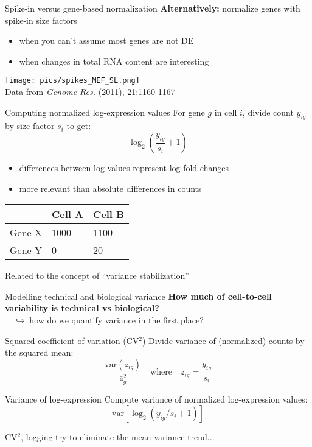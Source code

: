 \documentclass{beamer}
\begin{document}
\begin{frame}{Spike-in versus gene-based normalization}
    \vspace{0.1in}
\textbf{Alternatively:} normalize genes with spike-in size factors
\begin{itemize}
    \item when you can't assume most genes are not DE
    \item when changes in total RNA content are interesting
\end{itemize}
\begin{center}
    \texttt{[image: pics/spikes\_MEF\_SL.png]}\\
    {\tiny Data from \emph{Genome Res.} (2011), 21:1160-1167}
\end{center}
\end{frame}

\begin{frame}{Computing normalized log-expression values}
    For gene $g$ in cell $i$, divide count $y_{ig}$ by size factor $s_i$ to get:
    \[
        \log_2\left(\frac{y_{ig}}{s_{i}} + 1\right)
    \]
    
\begin{itemize}
    \item differences between log-values represent log-fold changes
    \item more relevant than absolute differences in counts
\end{itemize}
\begin{center}
\begin{tabular}{l l l}
\hline
& Cell A & Cell B \\
\hline
Gene X & 1000 & 1100 \\
Gene Y & 0 & 20 \\
\hline
\end{tabular}
\end{center}
Related to the concept of ``variance stabilization''
\end{frame}

\begin{frame}{Modelling technical and biological variance}
    \textbf{How much of cell-to-cell variability is technical vs biological?} \\
$\quad\hookrightarrow$ how do we quantify variance in the first place?

\begin{block}{Squared coefficient of variation (CV$^2$)}
    Divide variance of (normalized) counts by the squared mean:
    \[
        \frac{\mbox{var}(z_{ig})}{\bar{z}^2_g} \quad\mbox{where}\quad z_{ig} = \frac{y_{ig}}{s_i}
    \]
\end{block}

\begin{block}{Variance of log-expression}
    Compute variance of normalized log-expression values:
    \[
        \mbox{var}[\log_2(y_{ig}/s_i + 1)]
    \]
\end{block}

CV$^2$, logging try to eliminate the mean-variance trend...
\end{frame}
\end{document}
